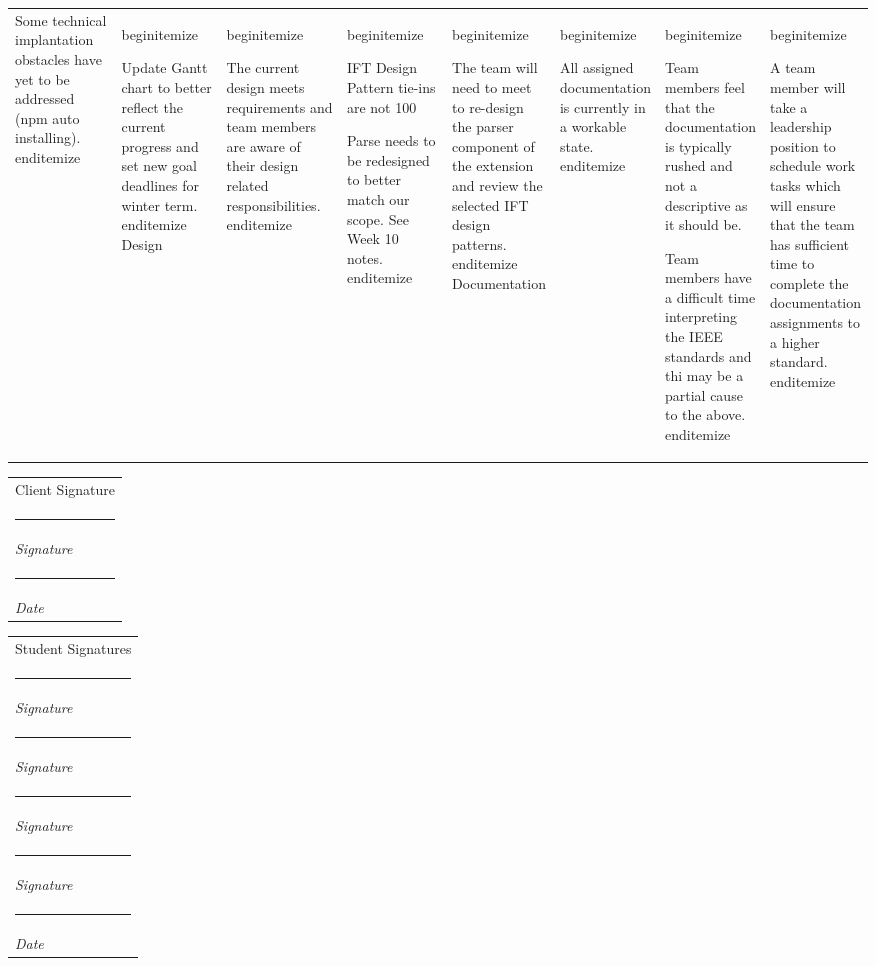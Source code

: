 \documentclass[letterpaper,10pt,titlepage,draftclsnofoot,onecolumn,onesided] {IEEEtran}
\makeatletter
\newcommand{\namesigdate}[2][4cm]{%
  \begin{tabular}{@{}p{#1}@{}}
    #2 \\[2\normalbaselineskip] \hrule \\[0pt]
    {\small \textit{Signature}} \\[2\normalbaselineskip] \hrule \\[0pt]
    {\small \textit{Date}}
  \end{tabular}
}
\newcommand{\studentnamesigdate}[2][4cm]{%
  \begin{tabular}{@{}p{#1}@{}}
    #2 \\[2\normalbaselineskip] \hrule \\[0pt]
    {\small \textit{Signature}} \\[2\normalbaselineskip] \hrule \\[0pt]
    {\small \textit{Signature}} \\[2\normalbaselineskip] \hrule \\[0pt]
    {\small \textit{Signature}} \\[2\normalbaselineskip] \hrule \\[0pt]
    {\small \textit{Signature}} \\[2\normalbaselineskip] \hrule \\[0pt]
    {\small \textit{Date}}
  \end{tabular}
}
\makeatother
\begin{document}
\begin{center}
\begin{tabular}{ |  p{0.25\linewidth}  |  p{0.25\linewidth}  | p{0.25\linewidth} | p{0.25\linewidth} |}
				\item Some technical implantation obstacles have yet to be addressed (npm auto installing).
			end{itemize}
		&
			begin{itemize}
				\item Update Gantt chart to better reflect the current progress and set new goal deadlines for winter term.
			end{itemize} 
		\hline
			Design 
		& 
			begin{itemize}
				\item The current design meets requirements and team members are aware of their design related responsibilities.
			end{itemize}
		& 
			begin{itemize}
				\item IFT Design Pattern tie-ins are not 100%
				\item Parse needs to be redesigned to better match our scope. See Week 10 notes.
			end{itemize}
		&
			begin{itemize}
				\item The team will need to meet to re-design the parser component of the extension and review the selected IFT design patterns.
			end{itemize} 
		\hline
			Documentation 
		& 
			begin{itemize}
				\item All assigned documentation is currently in a workable state.
			end{itemize}
		& 
			begin{itemize}
				\item Team members feel that the documentation is typically rushed and not a descriptive as it should be.
				\item Team members have a difficult time interpreting the IEEE standards and thi may be a partial cause to the above.
			end{itemize}
		&
			begin{itemize}
				\item A team member will take a leadership position to schedule work tasks which will ensure that the team has sufficient time to complete the documentation assignments to a higher standard. 
			end{itemize} 
		\hline
		\hline
		\end{tabular}
	\end{center}


\pagebreak


\pagebreak

\namesigdate{Client Signature} \hfill 
\studentnamesigdate[4cm]{Student Signatures}
\end{document}
